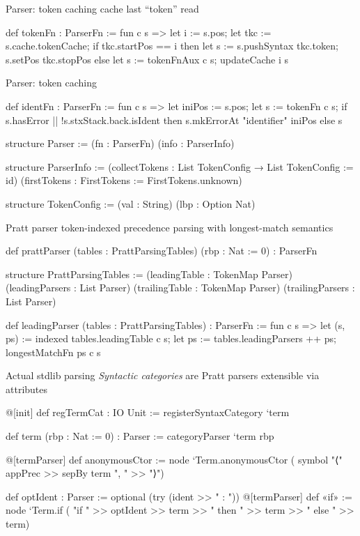 \documentclass[t]{beamer}
\begin{document}
\begin{frame}[fragile]{Parser: token caching}
  cache last ``token'' read
\begin{leancode}
def tokenFn : ParserFn :=
fun c s =>
  let i := s.pos;
  let tkc := s.cache.tokenCache;
  if tkc.startPos == i then
    let s := s.pushSyntax tkc.token;
    s.setPos tkc.stopPos
  else
    let s := tokenFnAux c s;
    updateCache i s
\end{leancode}
\end{frame}

\begin{frame}[fragile]{Parser: token caching}
\begin{leancode}
def identFn : ParserFn :=
fun c s =>
  let iniPos := s.pos;
  let s      := tokenFn c s;
  if s.hasError || !s.stxStack.back.isIdent then s.mkErrorAt "identifier" iniPos else s
\end{leancode}
  \vspace{-5mm}
  \pause
\begin{leancode}
structure Parser :=
(fn   : ParserFn)
(info : ParserInfo)

structure ParserInfo :=
(collectTokens : List TokenConfig → List TokenConfig   := id)
(firstTokens   : FirstTokens                           := FirstTokens.unknown)

structure TokenConfig :=
(val     : String)
(lbp     : Option Nat)
\end{leancode}
\end{frame}

\begin{frame}[fragile]{Pratt parser}
  token-indexed precedence parsing with longest-match semantics
\begin{leancode}
def prattParser (tables : PrattParsingTables) (rbp : Nat := 0) : ParserFn

structure PrattParsingTables :=
(leadingTable    : TokenMap Parser)
(leadingParsers  : List Parser)
(trailingTable   : TokenMap Parser)
(trailingParsers : List Parser)

def leadingParser (tables : PrattParsingTables) : ParserFn :=
fun c s =>
  let (s, ps) := indexed tables.leadingTable c s;
  let ps      := tables.leadingParsers ++ ps;
  longestMatchFn ps c s
\end{leancode}
\end{frame}

\begin{frame}[fragile]{Actual stdlib parsing}
  \emph{Syntactic categories} are Pratt parsers extensible via attributes
\begin{leancode}
@[init] def regTermCat : IO Unit :=
registerSyntaxCategory `term

def term (rbp : Nat := 0) : Parser :=
categoryParser `term rbp

@[termParser] def anonymousCtor := node `Term.anonymousCtor (
  symbol "⟨" appPrec >> sepBy term ", " >> "⟩")

def optIdent : Parser := optional (try (ident >> " : "))
@[termParser] def «if»  := node `Term.if (
  "if " >> optIdent >> term >> " then " >> term >> " else " >> term)
\end{leancode}
\end{frame}
\end{document}
